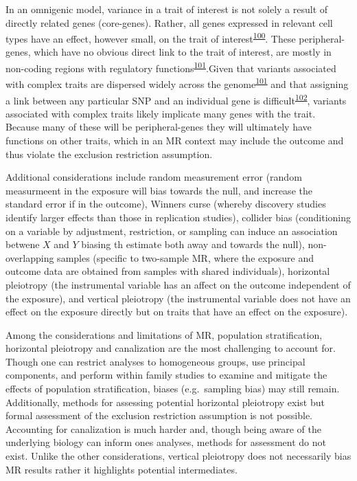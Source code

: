 \documentclass[11pt,twoside]{bristolthesis}
\begin{document}
In an omnigenic model, variance in a trait of interest is not solely a result of directly related genes (core-genes). Rather, all genes expressed in relevant cell types have an effect, however small, on the trait of interest\textsuperscript{\protect\hyperlink{ref-Boyle2017}{100}}. These peripheral-genes, which have no obvious direct link to the trait of interest, are mostly in non-coding regions with regulatory functions\textsuperscript{\protect\hyperlink{ref-Liu2019}{101}}.Given that variants associated with complex traits are dispersed widely across the genome\textsuperscript{\protect\hyperlink{ref-Liu2019}{101}} and that assigning a link between any particular SNP and an individual gene is difficult\textsuperscript{\protect\hyperlink{ref-GTEx2013}{102}}, variants associated with complex traits likely implicate many genes with the trait. Because many of these will be peripheral-genes they will ultimately have functions on other traits, which in an MR context may include the outcome and thus violate the exclusion restriction assumption.

Additional considerations include random measurement error (random measurmeent in the exposure will bias towards the null, and increase the standard error if in the outcome), Winners curse (whereby discovery studies identify larger effects than those in replication studies), collider bias (conditioning on a variable by adjustment, restriction, or sampling can induce an association betwene \(X\) and \(Y\) biasing th estimate both away and towards the null), non-overlapping samples (specific to two-sample MR, where the exposure and outcome data are obtained from samples with shared individuals), horizontal pleiotropy (the instrumental variable has an affect on the outcome independent of the exposure), and vertical pleiotropy (the instrumental variable does not have an effect on the exposure directly but on traits that have an effect on the exposure).

Among the considerations and limitations of MR, population stratification, horizontal pleiotropy and canalization are the most challenging to account for. Though one can restrict analyses to homogeneous groups, use principal components, and perform within family studies to examine and mitigate the effects of population stratification, biases (e.g.~sampling bias) may still remain. Additionally, methods for assessing potential horizontal pleiotropy exist but formal assessment of the exclusion restriction assumption is not possible. Accounting for canalization is much harder and, though being aware of the underlying biology can inform ones analyses, methods for assessment do not exist. Unlike the other considerations, vertical pleiotropy does not necessarily bias MR results rather it highlights potential intermediates.
\end{document}

